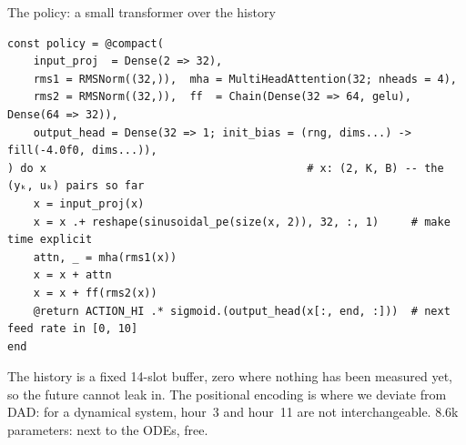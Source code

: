 \documentclass[aspectratio=169]{beamer}
\begin{document}
\begin{frame}[fragile]{The policy: a small transformer over the history}
\begin{lstlisting}
const policy = @compact(
    input_proj  = Dense(2 => 32),
    rms1 = RMSNorm((32,)),  mha = MultiHeadAttention(32; nheads = 4),
    rms2 = RMSNorm((32,)),  ff  = Chain(Dense(32 => 64, gelu), Dense(64 => 32)),
    output_head = Dense(32 => 1; init_bias = (rng, dims...) -> fill(-4.0f0, dims...)),
) do x                                        # x: (2, K, B) -- the (yₖ, uₖ) pairs so far
    x = input_proj(x)
    x = x .+ reshape(sinusoidal_pe(size(x, 2)), 32, :, 1)     # make time explicit
    attn, _ = mha(rms1(x))
    x = x + attn
    x = x + ff(rms2(x))
    @return ACTION_HI .* sigmoid.(output_head(x[:, end, :]))  # next feed rate in [0, 10]
end
\end{lstlisting}

  \vspace{0.2em}
  \begin{center}
  \end{center}

  {\small
  The history is a fixed 14-slot buffer, zero where nothing has been measured yet, so the future
  cannot leak in. The positional encoding is where we deviate from DAD: for a dynamical system,
  hour~3 and hour~11 are not interchangeable. 8.6k parameters: next to the ODEs, free.}
\end{frame}
\end{document}
